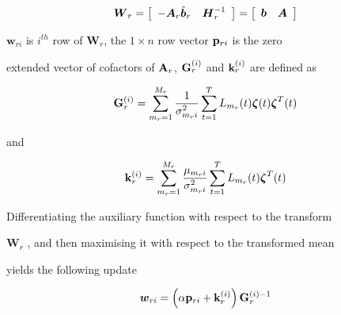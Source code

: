 \begin{eqnarray}


\bm{W}_r = \left[\begin{array}{c c}


-\bm{A}_r\tilde{\bm{b}}_r & \bm{H}_r^{-1} \end{array}


\right] =  \left[\begin{array}{c c}


\bm{b} & \bm{A} \end{array}


\right]


\end{eqnarray}


$\bm{w}_{ri}$ is $i^{th}$ row of $\bm{W}_r$, the $1\times n$ row vector ${\bf p}_{ri}$ is the zero  


extended vector of cofactors of ${\bf A}_r$, ${\bf G}^{(i)}_r$ and ${\bf k}^{(i)}_r$ are defined as


\begin{eqnarray}


{\bf G}^{(i)}_r=\sum_{m_r=1}^{M_r}


\frac{1}{\sigma_{m_ri}^{2}}


\sum_{t=1}^T\like{\bm\zeta}(t){\bm\zeta}^{T}(t)


\label{eq:gi_mllr3}


\end{eqnarray}


and 


\begin{eqnarray}


{\bf k}^{(i)}_r=\sum_{m_r=1}^{M_r}


\frac{\mu_{m_ri}}{\sigma_{m_ri}^{2}}


\sum_{t=1}^T\like{\bm\zeta}^{T}(t)


\label{eq:gi_mllr4}


\end{eqnarray}


Differentiating the auxiliary function with respect to the transform


$\bm{W}_r$ , and then maximising it with respect to the transformed mean


yields the following update


\begin{eqnarray}


\bm{w}_{ri} = \left(\alpha{{\bf p}_{ri}} + {\bf k}^{(i)}_r\right){\bf G}^{(i)-1}_r


\end{eqnarray}


